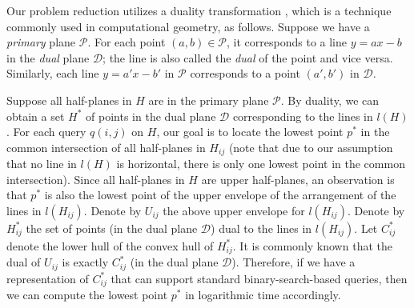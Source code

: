 \documentclass{llncs}
\def\calP{\mathcal{P}}
\def\calD{\mathcal{D}}
\begin{document}
Our problem reduction utilizes a duality transformation
\cite{ref:deBergCo08}, which is a technique commonly used in
computational geometry, as follows. Suppose we have a
{\em primary} plane $\calP$. For each point $(a,b)\in\calP$, it
corresponds to a line $y=ax-b$ in the {\em dual} plane $\calD$; the
line is also called the {\em dual} of the point and vice versa.
Similarly, each line $y=a'x-b'$ in $\calP$ corresponds to a point
$(a',b')$ in $\calD$.


Suppose all half-planes in $H$ are in the primary plane $\calP$.
By duality, we can obtain a
set $H^*$ of points in the dual plane $\calD$ corresponding to the
lines in $l(H)$. For each query $q(i,j)$ on $H$, our goal is to locate
the lowest point $p^*$ in the common intersection of all half-planes
in $H_{ij}$ (note that due to our assumption that no line in $l(H)$ is
horizontal, there is only one lowest point in the common intersection).
Since all half-planes in $H$ are upper half-planes,
an observation is that $p^*$ is also the lowest point of
the upper envelope of the arrangement of the lines in $l(H_{ij})$.
Denote by $U_{ij}$ the above upper envelope for $l(H_{ij})$.
Denote by $H^*_{ij}$ the set of points (in the dual plane $\calD$) dual to the
lines  in $l(H_{ij})$. Let $C^*_{ij}$ denote
the lower hull of the convex hull of $H^*_{ij}$. It is commonly known
\cite{ref:deBergCo08} that the dual of $U_{ij}$ is exactly $C^*_{ij}$
(in the dual plane $\calD$).
Therefore, if we have a representation of $C^*_{ij}$
that can support standard binary-search-based queries, then we can compute
the lowest point $p^*$ in logarithmic time accordingly.
\end{document}
